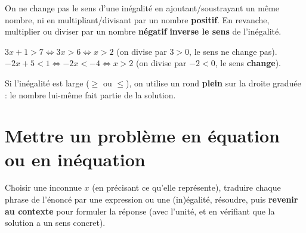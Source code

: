 \begin{propriete}
On ne change pas le sens d'une inégalité en ajoutant/soustrayant un même nombre, ni en
multipliant/divisant par un nombre \textbf{positif}. En revanche, multiplier ou diviser par
un nombre \textbf{négatif} \textbf{inverse le sens} de l'inégalité.
\end{propriete}

\begin{exemple}
$3x+1>7 \iff 3x>6 \iff x>2$ (on divise par $3>0$, le sens ne change pas). \quad
$-2x+5<1 \iff -2x<-4 \iff x>2$ (on divise par $-2<0$, le sens \textbf{change}).
\end{exemple}

\begin{illus}
\end{illus}

\begin{remarque}
Si l'inégalité est large ($\ge$ ou $\le$), on utilise un rond \textbf{plein} sur la droite
graduée : le nombre lui-même fait partie de la solution.
\end{remarque}

\section{Mettre un problème en équation ou en inéquation}

\begin{propriete}[Méthode]
Choisir une inconnue $x$ (en précisant ce qu'elle représente), traduire chaque phrase de
l'énoncé par une expression ou une (in)égalité, résoudre, puis \textbf{revenir au contexte}
pour formuler la réponse (avec l'unité, et en vérifiant que la solution a un sens concret).
\end{propriete}

